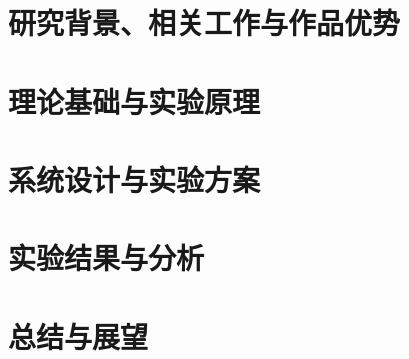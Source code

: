 \documentclass[UTF8,a4paper,11pt,titlepage,oneside]{ctexbook}
\begin{document}
\chapter{研究背景、相关工作与作品优势}
\chapter{理论基础与实验原理}
\chapter{系统设计与实验方案}
\chapter{实验结果与分析}
\chapter{总结与展望}
\backmatter\renewcommand{\bibname}{参考文献}

\end{document}
